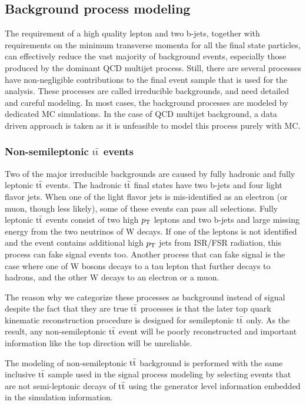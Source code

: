 \subsection{Background process modeling}
The requirement of a high quality lepton and two b-jets, together with requirements on the minimum transverse momenta for all the final state particles, can effectively reduce the vast majority of background events, especially those produced by the dominant QCD multijet process. Still, there are several processes have non-negligible contributions to the final event sample that is used for the analysis. These processes are called irreducible backgrounds, and need detailed and careful modeling. In most cases, the background processes are modeled by dedicated MC simulations. In the case of QCD multijet background, a data driven approach is taken as it is unfeasible to model this process purely with MC.

\subsubsection*{Non-semileptonic $\mathrm{t}\bar{\mathrm{t}}$ events}
Two of the major irreducible backgrounds are caused by fully hadronic and fully leptonic $\mathrm{t}\bar{\mathrm{t}}$ events. The hadronic $\mathrm{t}\bar{\mathrm{t}}$ final states have two b-jets and four light flavor jets. When one of the light flavor jets is mis-identified as an electron (or muon, though less likely), some of these events can pass all selections. Fully leptonic $\mathrm{t}\bar{\mathrm{t}}$ events consist of two high $p_\mathrm{T}$ leptons and two b-jets and large missing energy from the two neutrinos of W decays. If one of the leptons is not identified and the event contains additional high $p_\mathrm{T}$ jets from ISR/FSR radiation, this process can fake signal events too. Another process that can fake signal is the case where one of W bosons decays to a tau lepton that further decays to hadrons, and the other W decays to an electron or a muon. 

The reason why we categorize these processes as background instead of signal despite the fact that they are true $\mathrm{t}\bar{\mathrm{t}}$ processes is that the later top quark kinematic reconstruction procedure is designed for semileptonic $\mathrm{t}\bar{\mathrm{t}}$ only. As the result, any non-semileptonic $\mathrm{t}\bar{\mathrm{t}}$ event will be poorly reconstructed and important information like the top direction will be unreliable.

The modeling of non-semileptonic $\mathrm{t}\bar{\mathrm{t}}$ background is performed with the same inclusive $\mathrm{t}\bar{\mathrm{t}}$ sample used in the signal process modeling by selecting events that are not semi-leptonic decays of $\mathrm{t}\bar{\mathrm{t}}$ using the generator level information embedded in the simulation information.

